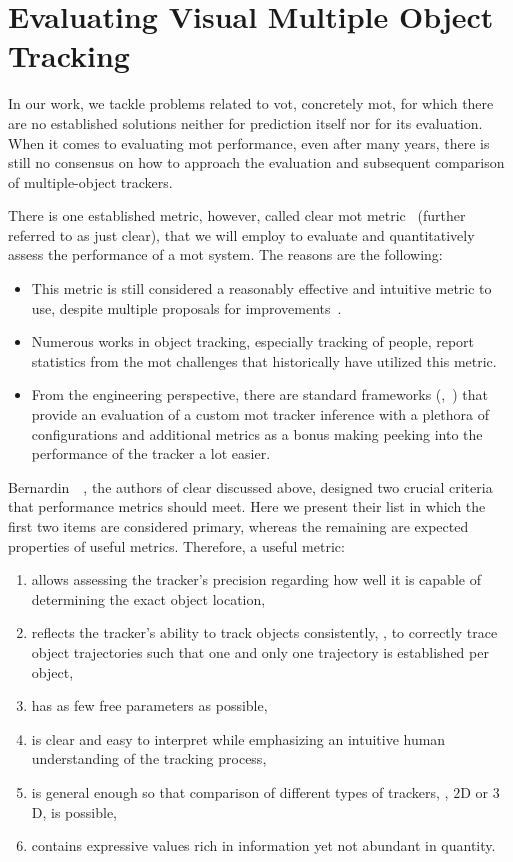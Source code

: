 \section{Evaluating Visual Multiple Object Tracking}
\label{sec:EvaluatingMOT}

In our work, we tackle problems related to \Gls{vot}, concretely \gls{mot}, for which there are no established solutions neither for prediction itself nor for its evaluation. When it comes to evaluating \gls{mot} performance, even after many years, there is still no consensus on how to approach the evaluation and subsequent comparison of multiple-object trackers.

There is one established metric, however, called \gls{clear} \gls{mot} metric~\cite{bernardin2008clearmot} (further referred to as just \gls{clear}), that we will employ to evaluate and quantitatively assess the performance of a \gls{mot} system. The reasons are the following:
\begin{itemize}
    \item This metric is still considered a reasonably effective and intuitive metric to use, despite multiple proposals for improvements~\cite{wen2020uadetrac}.
    \item Numerous works in object tracking, especially tracking of people, report statistics from the \gls{mot} challenges that historically have utilized this metric.
    \item From the engineering perspective, there are standard frameworks (\egtext{},~\cite{webpymotmetrics}) that provide an evaluation of a custom \gls{mot} tracker inference with a plethora of configurations and additional metrics as a bonus making peeking into the performance of the tracker a lot easier.
\end{itemize}

Bernardin~\etal{}~\cite{bernardin2008clearmot}, the authors of \gls{clear} discussed above, designed two crucial criteria that performance metrics should meet. Here we present their list in which the first two items are considered primary, whereas the remaining are expected properties of useful metrics. Therefore, a useful metric:
\begin{enumerate}
    \item allows assessing the tracker's precision regarding how well it is capable of determining the exact object location,
    \item reflects the tracker's ability to track objects consistently, \ietext{}, to correctly trace object trajectories such that one and only one trajectory is established per object,
    \item has as few free parameters as possible,
    \item is clear and easy to interpret while emphasizing an intuitive human understanding of the tracking process,
    \item is general enough so that comparison of different types of trackers, \egtext{}, $2$D or $3$D, is possible,
    \item contains expressive values rich in information yet not abundant in quantity.
\end{enumerate}

